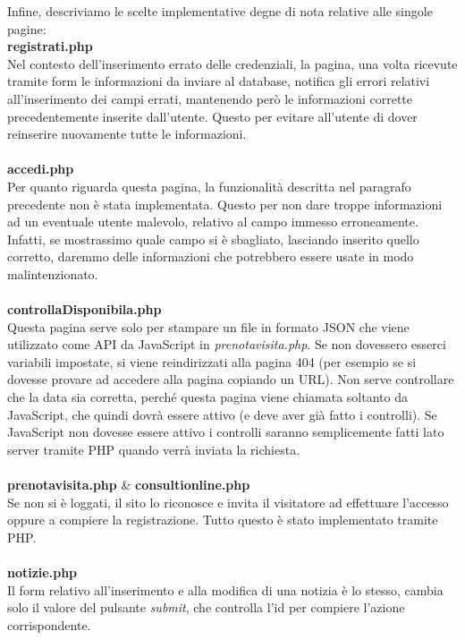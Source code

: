 \pagebreak

Infine, descriviamo le scelte implementative degne di nota relative alle singole pagine: \\

\textbf{registrati.php} \\ 
Nel contesto dell'inserimento errato delle credenziali, la pagina, una volta ricevute tramite form le informazioni da inviare al database, notifica gli errori relativi all'inserimento dei campi errati, mantenendo però le informazioni corrette precedentemente inserite dall'utente. Questo per evitare all'utente di dover reinserire nuovamente tutte le informazioni. \\ \\

\textbf{accedi.php} \\ 
Per quanto riguarda questa pagina, la funzionalità descritta nel paragrafo precedente non è stata implementata. Questo per non dare troppe informazioni ad un eventuale utente malevolo, relativo al campo immesso erroneamente. Infatti, se mostrassimo quale campo si è sbagliato, lasciando inserito quello corretto, daremmo delle informazioni che potrebbero essere usate in modo malintenzionato. \\ \\

\textbf{controllaDisponibila.php} \\
Questa pagina serve solo per stampare un file in formato JSON che viene utilizzato come API da JavaScript in \textit{prenotavisita.php}. Se non dovessero esserci variabili impostate, si viene reindirizzati alla pagina 404 (per esempio se si dovesse provare ad accedere alla pagina copiando un URL).
Non serve controllare che la data sia corretta, perché questa pagina viene chiamata soltanto da JavaScript, che quindi dovrà essere attivo (e deve aver già fatto i controlli).
Se JavaScript non dovesse essere attivo i controlli saranno semplicemente fatti lato server tramite PHP quando verrà inviata la richiesta. \\ \\

\textbf{prenotavisita.php} \& \textbf{consultionline.php} \\
Se non si è loggati, il sito lo riconosce e invita il visitatore ad effettuare l'accesso oppure a compiere la registrazione. Tutto questo è stato implementato tramite PHP. \\ \\

\textbf{notizie.php} \\
Il form relativo all'inserimento e alla modifica di una notizia è lo stesso, cambia solo il valore del pulsante \textit{submit}, che controlla l'id per compiere l'azione corrispondente. \\ \\

